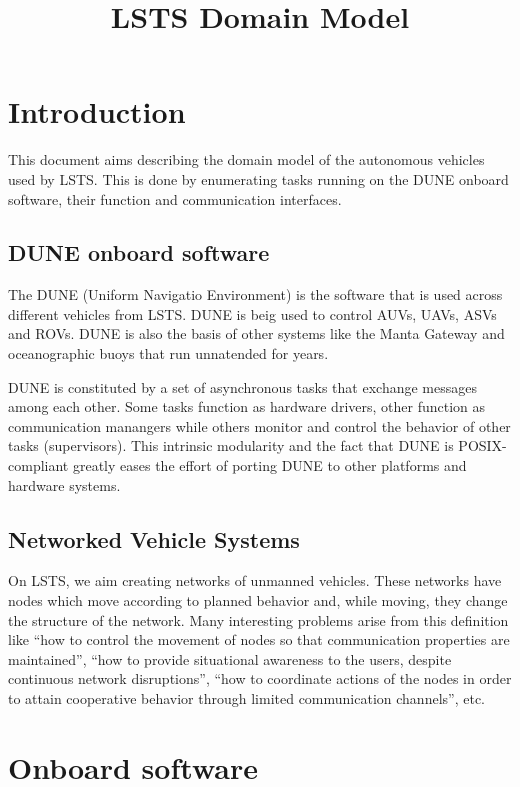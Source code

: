 \documentclass{article}
\begin{document}
\title{LSTS Domain Model}

\maketitle

\section{Introduction}

This document aims describing the domain model of the autonomous vehicles used
by LSTS. This is done by enumerating tasks running on the DUNE onboard software,
their function and communication interfaces.

\subsection{DUNE onboard software}
The DUNE (Uniform Navigatio Environment) is the software that is used across
different vehicles from LSTS. DUNE is beig used to control AUVs, UAVs, ASVs and
ROVs. DUNE is also the basis of other systems like the Manta Gateway and
oceanographic buoys that run unnatended for years.

DUNE is constituted by a set of asynchronous tasks that exchange messages among
each other. Some tasks function as hardware drivers, other function as
communication manangers while others monitor and control the behavior of other
tasks (supervisors). This intrinsic modularity and the fact that DUNE is
POSIX-compliant greatly eases the effort of porting DUNE to other platforms and
hardware systems.

\subsection{Networked Vehicle Systems}
On LSTS, we aim creating networks of unmanned vehicles. These networks have
nodes which move according to planned behavior and, while moving, they change
the structure of the network. Many interesting problems arise from this
definition like ``how to control the movement of nodes so that communication
properties are maintained'', ``how to provide situational awareness to the
users, despite continuous network disruptions'', ``how to coordinate actions of
the nodes in order to attain cooperative behavior through limited communication
channels'', etc.

\section{Onboard software}
\end{document}
